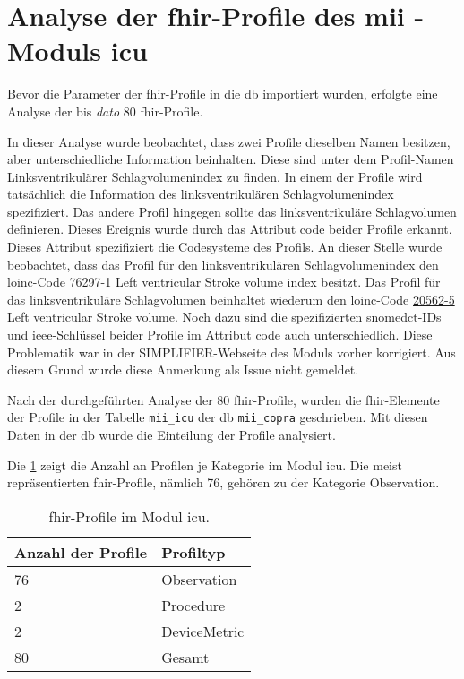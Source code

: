 \section{Analyse der \acs{fhir}-Profile des \acs{mii} - Moduls \acs{icu}} \label{sec:fhiricuresult}

Bevor die Parameter der \ac{fhir}-Profile in die \ac{db} importiert wurden, erfolgte eine Analyse der bis \textit{dato} 80 \ac{fhir}-Profile. 

In dieser Analyse wurde beobachtet, dass zwei Profile dieselben Namen besitzen, aber unterschiedliche Information beinhalten. Diese sind unter dem Profil-Namen \glqq Linksventrikulärer Schlagvolumenindex\grqq{} zu finden. In einem der Profile wird tatsächlich die Information des linksventrikulären Schlagvolumenindex spezifiziert. Das andere Profil hingegen sollte das linksventrikuläre Schlagvolumen definieren. Dieses Ereignis wurde durch das Attribut \glqq code\grqq{} beider Profile erkannt. Dieses Attribut spezifiziert die Codesysteme des Profils. An dieser Stelle wurde beobachtet, dass das Profil für den linksventrikulären Schlagvolumenindex den \ac{loinc}-Code \href{https://loinc.org/76297-1/}{76297-1} \glqq Left ventricular Stroke volume index\grqq{} besitzt. Das Profil für das linksventrikuläre Schlagvolumen beinhaltet wiederum den \ac{loinc}-Code \href{https://loinc.org/20562-5/}{20562-5} \glqq Left ventricular Stroke volume\grqq{}. Noch dazu sind die spezifizierten \ac{snomedct}-IDs und \ac{ieee}-Schlüssel beider Profile im Attribut \glqq code\grqq{} auch unterschiedlich. Diese Problematik war in der SIMPLIFIER-Webseite des Moduls vorher korrigiert. Aus diesem Grund wurde diese Anmerkung als Issue nicht gemeldet.

Nach der durchgeführten Analyse der 80 \acs{fhir}-Profile, wurden die \ac{fhir}-Elemente der Profile in der Tabelle \texttt{mii\_icu} der \ac{db} \texttt{mii\_copra} geschrieben. Mit diesen Daten in der \ac{db} wurde die Einteilung der Profile analysiert.

Die \ref{tab:proficu} zeigt die Anzahl an Profilen je Kategorie im Modul \glqq\ac{icu}\grqq{}. Die meist repräsentierten \ac{fhir}-Profile, nämlich 76, gehören zu der Kategorie \glqq Observation\grqq{}.

\begin{table}[ht]
	\centering 
	\caption[\acs{fhir}-Profile im Modul \glqq\acs{icu}\grqq{}]{\acs{fhir}-Profile im Modul \glqq\acs{icu}\grqq{}.}
	\label{tab:proficu}
	\begin{tabular}{|l|l|}
		\hline
		\bfseries Anzahl der Profile & \bfseries Profiltyp \\ \hline
		76 & Observation \\ \hline
		2 & Procedure \\ \hline   
		2 & DeviceMetric \\ \hline
		80 & Gesamt \\ \hline
	\end{tabular}
\end{table}

